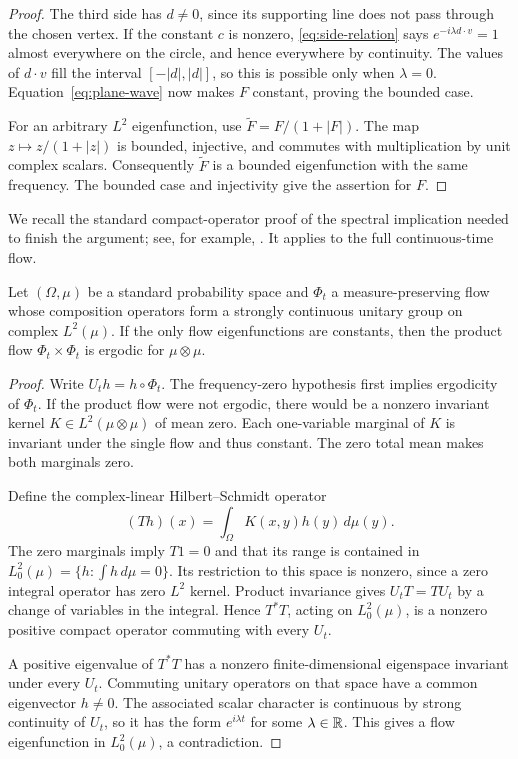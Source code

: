 \begin{proof}
The third side has \(d\ne0\), since its supporting line does not pass
through the chosen vertex. If the constant \(c\) is nonzero,
\eqref{eq:side-relation} says \(e^{-i\lambda d\cdot v}=1\) almost
everywhere on the circle, and hence everywhere by continuity. The values
of \(d\cdot v\) fill the interval \([-|d|,|d|]\), so this is possible
only when \(\lambda=0\). Equation~\eqref{eq:plane-wave} now makes \(F\)
constant, proving the bounded case.

For an arbitrary \(L^2\) eigenfunction, use
\(\widetilde F=F/(1+|F|)\). The map \(z\mapsto z/(1+|z|)\) is bounded,
injective, and commutes with multiplication by unit complex scalars.
Consequently \(\widetilde F\) is a bounded eigenfunction with the same
frequency. The bounded case and injectivity give the assertion for \(F\).
\end{proof}

We recall the standard compact-operator proof of the spectral implication
needed to finish the argument; see, for example,
\cite[Theorem~6.1.4]{Peterson2015}. It applies
to the full continuous-time flow.

\begin{lemma}\label{lem:spectral}
Let \((\Omega,\mu)\) be a standard probability space and \(\Phi_t\) a
measure-preserving flow whose composition operators form a strongly
continuous unitary group on complex \(L^2(\mu)\). If the only flow
eigenfunctions are constants, then the product flow
\(\Phi_t\times\Phi_t\) is ergodic for \(\mu\otimes\mu\).
\end{lemma}

\begin{proof}
Write \(U_t h=h\circ\Phi_t\). The frequency-zero hypothesis first implies
ergodicity of \(\Phi_t\). If the product flow were not ergodic, there
would be a nonzero invariant kernel \(K\in L^2(\mu\otimes\mu)\) of mean
zero. Each one-variable marginal of \(K\) is invariant under the single
flow and thus constant. The zero total mean makes both marginals zero.

Define the complex-linear Hilbert--Schmidt operator
\[
 (Th)(x)=\int_\Omega K(x,y)h(y)\,d\mu(y).
\]
The zero marginals imply \(T1=0\) and that its range is contained in
\(L^2_0(\mu)=\{h:\int h\,d\mu=0\}\). Its restriction to this space
is nonzero, since a zero integral operator has zero \(L^2\) kernel.
Product invariance gives \(U_tT=TU_t\) by a change of variables in the
integral. Hence \(T^*T\), acting on \(L^2_0(\mu)\), is a nonzero
positive compact operator commuting with every \(U_t\).

A positive eigenvalue of \(T^*T\) has a nonzero finite-dimensional
eigenspace invariant under every \(U_t\). Commuting unitary operators
on that space have a common eigenvector \(h\ne0\). The associated
scalar character is continuous by strong continuity of \(U_t\), so
it has the form \(e^{i\lambda t}\) for some \(\lambda\in\mathbb R\).
This gives a flow eigenfunction in \(L^2_0(\mu)\), a contradiction.
\end{proof}

